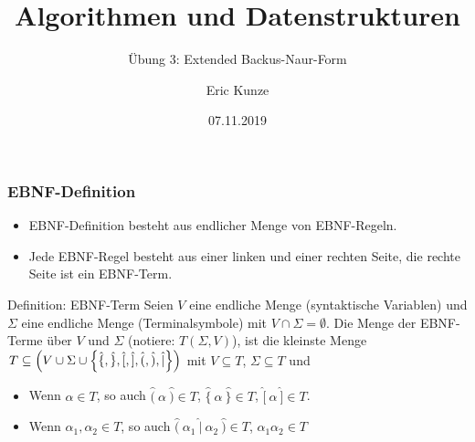 \documentclass{beamer}
\newcommand{\wdh}[1]{\hat{\{} \ #1 \ \hat{\}}}
\newcommand{\opt}[2]{\hat{(} \ #1 \ \hat{|} \ #2 \ \hat{)}}
\newcommand{\byp}[1]{\hat{[} \ #1 \ \hat{]}}
\newcommand{\rdb}[1]{\hat{(} \ #1 \ \hat{)}}
\begin{document}
	
	\title{Algorithmen und Datenstrukturen}
	\subtitle{Übung 3: Extended Backus-Naur-Form}
	\author{Eric Kunze}
	\date{07.11.2019}

	\maketitle



\begin{frame} \frametitle{EBNF-Definition}
	\small
	\begin{itemize}
		\item EBNF-Definition besteht aus endlicher Menge von EBNF-Regeln.
		\item Jede EBNF-Regel besteht aus einer linken und einer rechten Seite, die rechte Seite ist ein EBNF-Term.
	\end{itemize}
	\pause
	\begin{block}{Definition: EBNF-Term}
		Seien $V$ eine endliche Menge (syntaktische Variablen) und $\Sigma$ eine endliche Menge (Terminalsymbole) mit $V \cap \Sigma = \emptyset$. Die Menge der EBNF-Terme über $V$ und $\Sigma$ (notiere: $T(\Sigma, V)$), ist die kleinste Menge $T \subseteq \left( V \cup \Sigma \cup \left\{ \hat{\{}, \hat{\}}, \hat{[}, \hat{]}, \hat{(}, \hat{)}, \hat{|} \right\} \right)$ mit $V \subseteq T$, $\Sigma \subseteq T$ und
		\begin{itemize}
			\item Wenn $\alpha \in T$, so auch $\rdb{\alpha} \in T$, $\wdh{\alpha} \in T$, $\byp{\alpha} \in T$.
			\item Wenn $\alpha_1, \alpha_2 \in T$, so auch $\opt{\alpha_1}{\alpha_2} \in T$, $\alpha_1 \alpha_2 \in T$
		\end{itemize}
	\end{block}
\end{frame}
\end{document}
